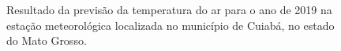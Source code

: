 \begin{figure}[H]%
\caption{Resultado da previsão da temperatura do ar para o ano de 2019 na estação meteorológica localizada no município de Cuiabá, no estado do Mato Grosso.}
\centering
{}
\qquad
{}
\label{fig:results_lstm_83361}%
\end{figure}

\renewcommand{\cleardoublepage}{}
\renewcommand{\clearpage}{}
\vspace{5mm}